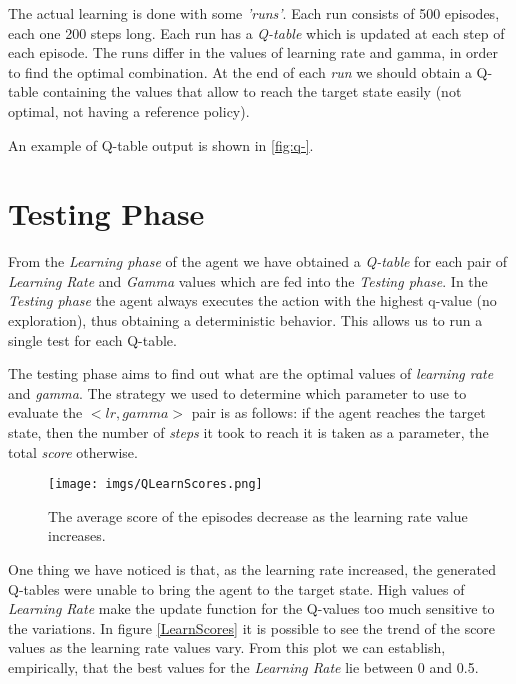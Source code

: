 The actual learning is done with some \textit{'runs'}. Each run consists of 500 episodes, each one 200 steps long. Each run has a \textit{Q-table} which is updated at each step of each episode. The runs differ in the values of learning rate and gamma, in order to find the optimal combination. At the end of each \textit{run} we should obtain a Q-table containing the values that allow to reach the target state easily (not optimal, not having a reference policy).

An example of Q-table output is shown in \ref{fig:q-}.

\section{Testing Phase}
From the \textit{Learning phase} of the agent we have obtained a \textit{Q-table} for each pair of \textit{Learning Rate} and \textit{Gamma} values which are fed into the \textit{Testing phase}.
In the \textit{Testing phase} the agent always executes the action with the highest q-value (no exploration), thus obtaining a deterministic behavior. This allows us to run a single test for each Q-table.

The testing phase aims to find out what are the optimal values of \textit{learning rate} and \textit{gamma}. The strategy we used to determine which parameter to use to evaluate the $<lr, gamma>$ pair is as follows: if the agent reaches the target state, then the number of \textit{steps} it took to reach it is taken as a parameter, the total \textit{score} otherwise.

\begin{figure}[h!]
	\centering
	\texttt{[image: imgs/QLearnScores.png]}
	\caption{The average score of the episodes decrease as the learning rate value increases.}
	\label{fig:LearnScores}
\end{figure}

One thing we have noticed is that, as the learning rate increased, the generated Q-tables were unable to bring the agent to the target state. High values of \textit{Learning Rate} make the update function for the Q-values too much sensitive to the variations. In figure \ref{LearnScores} it is possible to see the trend of the score values as the learning rate values vary. From this plot we can establish, empirically, that the best values for the \textit{Learning Rate} lie between 0 and 0.5.


